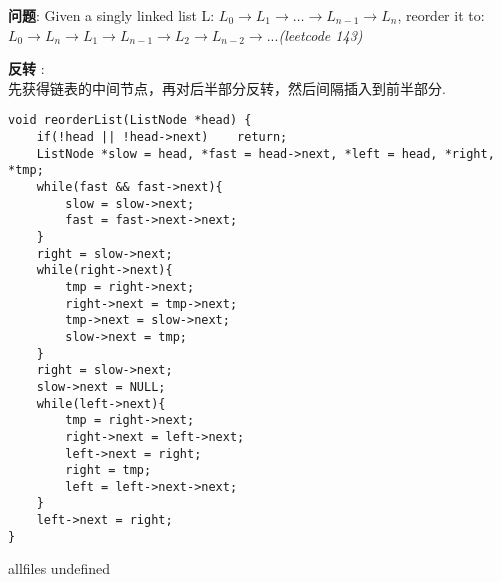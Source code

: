 \documentclass{article}
\begin{document}
\begin{CJK}{UTF8}{gbsn}     %

\else
    
\begin{description}
    \item{\textbf{问题}}: Given a singly linked list L: $L_0 \rightarrow L_1 \rightarrow … \rightarrow L_{n-1} \rightarrow L_n$, reorder it to: $L_0 \rightarrow L_n \rightarrow L_1 \rightarrow L_{n-1} \rightarrow L_2 \rightarrow L_{n-2} \rightarrow...$\textit{(leetcode 143)}
    \item{\textbf{反转}} : 
    \\先获得链表的中间节点，再对后半部分反转，然后间隔插入到前半部分.
    \begin{lstlisting}
void reorderList(ListNode *head) {
	if(!head || !head->next)	return;
	ListNode *slow = head, *fast = head->next, *left = head, *right, *tmp;
	while(fast && fast->next){
		slow = slow->next;
		fast = fast->next->next;
	}
	right = slow->next;
	while(right->next){
		tmp = right->next;
		right->next = tmp->next;
		tmp->next = slow->next;
		slow->next = tmp;
	}
	right = slow->next;
	slow->next = NULL;
	while(left->next){
		tmp = right->next;
		right->next = left->next;
		left->next = right;
		right = tmp;
		left = left->next->next;
	}
	left->next = right;
}
    \end{lstlisting}
\end{description}

\fi

\ifx allfiles undefined
\end{CJK}
\end{document}
